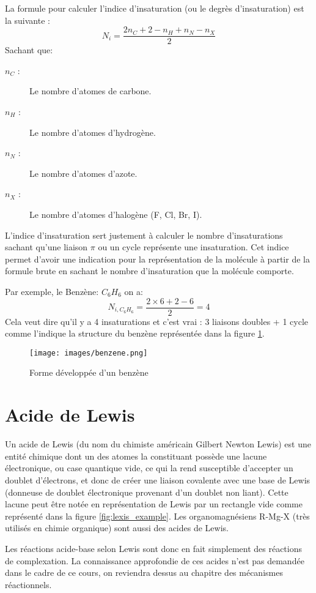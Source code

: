 La formule pour calculer l'indice d'insaturation (ou le degrès d'insaturation) est la suivante :
\begin{equation}
    N_i = \frac{2n_C+2 - n_H + n_N - n_X}{2}
\end{equation}
Sachant que:
\begin{description}
    \item[$n_C$ :] Le nombre d'atomes de carbone.
    \item[$n_H$  :] Le nombre d'atomes d'hydrogène.
    \item[$n_N$ :] Le nombre d'atomes d'azote.
    \item[$n_X$ :] Le nombre d'atomes d'halogène (F, Cl, Br, I).
\end{description}
L'indice d'insaturation sert justement à calculer le nombre d'insaturations sachant qu'une liaison $\pi$ ou un cycle représente une insaturation. Cet indice permet d'avoir une indication pour la représentation de la molécule à partir de la formule brute en sachant le nombre d'insaturation que la molécule comporte.

Par exemple, le Benzène: $C_6H_6$ on a:
\begin{equation}
    N_{i,C_6H_6}=\frac{2\times6+2-6}{2}=4
\end{equation}
Cela veut dire qu'il y a 4 insaturations et c'est vrai : 3 liaisons doubles + 1 cycle comme l'indique la structure du benzène représentée dans la figure \ref{fig:benzene_dev}. 
\begin{figure}[htbp]
    \centering
    \texttt{[image: images/benzene.png]}
    \caption{Forme développée d'un benzène}
    \label{fig:benzene_dev}
\end{figure}
\section{Acide de Lewis}
Un acide de Lewis (du nom du chimiste américain Gilbert Newton Lewis) est une entité chimique dont un des atomes la constituant possède une lacune électronique, ou case quantique vide, ce qui la rend susceptible d'accepter un doublet d'électrons, et donc de créer une liaison covalente avec une base de Lewis (donneuse de doublet électronique provenant d'un doublet non liant). Cette lacune peut être notée en représentation de Lewis par un rectangle vide comme représenté dans la figure \ref{fig:lexis_example}. Les organomagnésiens R-Mg-X (très utilisés en chimie organique) sont aussi des acides de Lewis.

Les réactions acide-base selon Lewis sont donc en fait simplement des réactions de complexation. La connaissance approfondie de ces acides n'est pas demandée dans le cadre de ce cours, on reviendra dessus au chapitre des mécanismes réactionnels.

